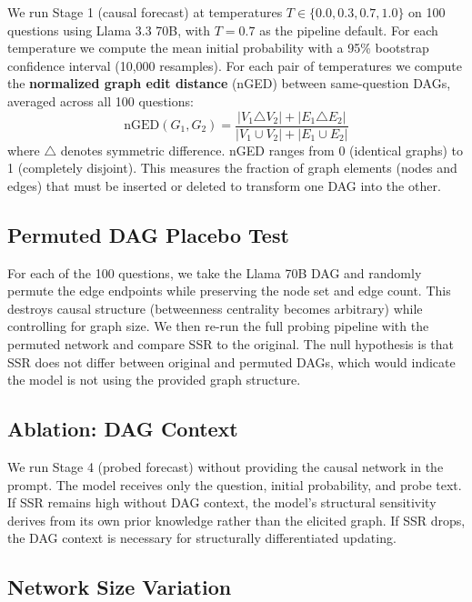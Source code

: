 \documentclass[11pt]{article}
\begin{document}
We run Stage 1 (causal forecast) at temperatures $T \in \{0.0, 0.3, 0.7, 1.0\}$ on 100 questions using Llama 3.3 70B, with $T = 0.7$ as the pipeline default. For each temperature we compute the mean initial probability with a 95\% bootstrap confidence interval (10,000 resamples). For each pair of temperatures we compute the \textbf{normalized graph edit distance} (nGED) between same-question DAGs, averaged across all 100 questions:
\begin{equation}
    \text{nGED}(G_1, G_2) = \frac{|V_1 \triangle V_2| + |E_1 \triangle E_2|}{|V_1 \cup V_2| + |E_1 \cup E_2|}
\end{equation}
where $\triangle$ denotes symmetric difference. nGED ranges from 0 (identical graphs) to 1 (completely disjoint). This measures the fraction of graph elements (nodes and edges) that must be inserted or deleted to transform one DAG into the other.

\subsection{Permuted DAG Placebo Test}

For each of the 100 questions, we take the Llama 70B DAG and randomly permute the edge endpoints while preserving the node set and edge count. This destroys causal structure (betweenness centrality becomes arbitrary) while controlling for graph size. We then re-run the full probing pipeline with the permuted network and compare SSR to the original. The null hypothesis is that SSR does not differ between original and permuted DAGs, which would indicate the model is not using the provided graph structure.

\subsection{Ablation: DAG Context}

We run Stage 4 (probed forecast) without providing the causal network in the prompt. The model receives only the question, initial probability, and probe text. If SSR remains high without DAG context, the model's structural sensitivity derives from its own prior knowledge rather than the elicited graph. If SSR drops, the DAG context is necessary for structurally differentiated updating.

\subsection{Network Size Variation}
\end{document}
